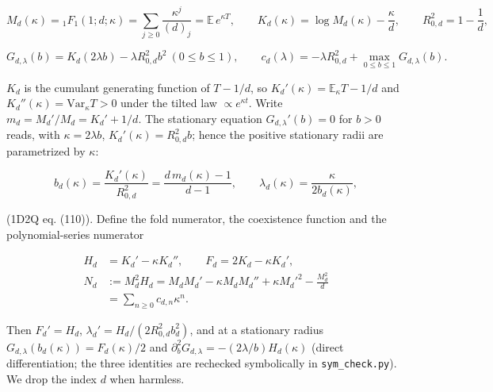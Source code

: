 \documentclass[
  11pt,
  a4paper,
]{article}
\begin{document}
\[M_d(\kappa)={}_1F_1(1;d;\kappa)=\sum_{j\ge0}\frac{\kappa^j}{(d)_j}=\mathbb E\,e^{\kappa T},\qquad K_d(\kappa)=\log M_d(\kappa)-\frac{\kappa}{d},\qquad R_{0,d}^2=1-\frac1d, \tag{2.1}\]

\[G_{d,\lambda}(b)=K_d(2\lambda b)-\lambda R_{0,d}^2b^2\ (0\le b\le1),\qquad c_d(\lambda)=-\lambda R_{0,d}^2+\max_{0\le b\le1}G_{d,\lambda}(b). \tag{2.2}\]

\(K_d\) is the cumulant generating function of \(T-1/d\), so
\(K_d'(\kappa)=\mathbb E_\kappa T-1/d\) and
\(K_d''(\kappa)=\mathrm{Var}_\kappa T>0\) under the tilted law
\(\propto e^{\kappa t}\). Write \(m_d=M_d'/M_d=K_d'+1/d\). The
stationary equation \(G_{d,\allowbreak{}\lambda}'(b)=0\) for \(b>0\) reads, with
\(\kappa=2\lambda b\), \(K_d'(\kappa)=R_{0,\allowbreak{}d}^2b\); hence the positive
stationary radii are parametrized by \(\kappa\):

\[b_d(\kappa)=\frac{K_d'(\kappa)}{R_{0,d}^2}=\frac{d\,m_d(\kappa)-1}{d-1},\qquad \lambda_d(\kappa)=\frac{\kappa}{2b_d(\kappa)}, \tag{2.3}\]

(1D2Q eq. (110)). Define the fold numerator, the coexistence function
and the polynomial-series numerator

\[\begin{aligned}H_d&=K_d'-\kappa K_d'',\qquad F_d=2K_d-\kappa K_d',\\ N_d&:=M_d^2H_d=M_dM_d'-\kappa M_dM_d''+\kappa M_d'^2-\frac{M_d^2}{d}\\&=\sum_{n\ge0}c_{d,n}\kappa^n.\end{aligned}\tag{2.4}\]

Then \(F_d'=H_d\), \(\lambda_d'=H_d/(2R_{0,\allowbreak{}d}^2b_d^2)\), and at a
stationary radius \(G_{d,\allowbreak{}\lambda}(b_d(\kappa))=F_d(\kappa)/2\) and
\(\partial_b^2G_{d,\allowbreak{}\lambda}=-(2\lambda/b)H_d(\kappa)\) (direct
differentiation; the three identities are rechecked symbolically in
{\small\texttt{sym\_\allowbreak{}check.\allowbreak{}py}}). We drop the index \(d\) when harmless.
\end{document}
